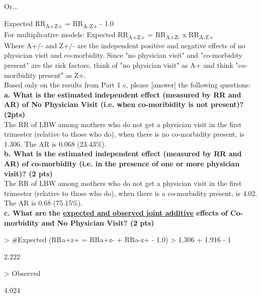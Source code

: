 \documentclass[12pt]{article}
\begin{document}
\begin{center}
Or...
\end{center}

Expected RR\textsubscript{A+Z+} = RR\textsubscript{A-Z+} - 1.0 \\

For multiplicative models: Expected RR\textsubscript{A+Z+} = RR\textsubscript{A+Z-} x RR\textsubscript{A-Z+} \\

Where A+/- and Z+/- are the independent positive and negative effects of no physician visit and co-morbidity.  Since "no physician visit" and "co-morbidity present" are the risk factors, think of "no physician visit" as A+ and think "co-moribidity present" as Z+. \\

Based only on the results from Part 1 c, please [answer] the following questions:\\

\noindent \textbf{a. What is the estimated independent effect (measured by RR and AR) of No Physician Visit (i.e. when co-moribidity is not present)? (2pts)} \\

The RR of LBW among mothers who do not get a physician visit in the first trimester (relative to those who do), when there is no co-morbidity present, is 1.306.  The AR is 0.068 (23.43\%).\\

\noindent \textbf{b. What is the estimated independent effect (measured by RR and AR) of co-morbidity (i.e. in the presence of one or more physician visit)? (2 pts)} \\

The RR of LBW among mothers who do not get a physician visit in the first trimester (relative to those who do), when there is a co-morbidity present, is 4.02.  The AR is 0.68 (75.15\%).\\

\noindent \textbf{c. What are the \underline{expected and observed joint additive} effects of Co-morbidity and No Physician Visit? (2 pts)} \\


\begin{Schunk}
\begin{Sinput}
> #Expected (RRa+z+ = RRa+z- + RRa-z+ - 1.0)
> 1.306 + 1.916 - 1
\end{Sinput}
\begin{Soutput}
[1] 2.222
\end{Soutput}
\begin{Sinput}
> Observed
\end{Sinput}
\begin{Soutput}
[1] 4.024
\end{Soutput}
\end{Schunk}
\end{document}
